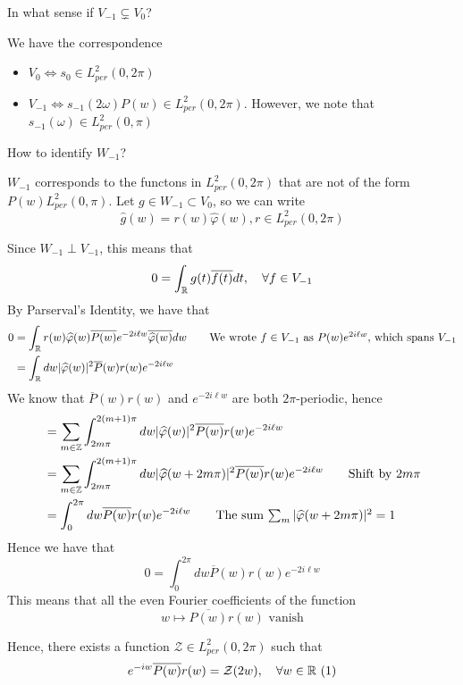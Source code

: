 \documentclass{article}
\begin{document}
{\begin{question}
    In what sense if $V_{-1} \subsetneq V_0$?
\end{question}
We have the correspondence
\begin{itemize}
    \item $V_0 \iff s_0 \in L^2_{per}(0, 2\pi)$
    \item $V_{-1} \iff s_{-1}(2\omega) P(w) \in L^2_{per}(0, 2\pi)$. However, we note that $s_{-1}(\omega) \in L_{per}^2(0, \pi)$
\end{itemize}

\begin{question}
How to identify $W_{-1}$?
\end{question}

$W_{-1}$ corresponds to the functons in $L^2_{per}(0, 2\pi)$ that are not of the form $P(w) L^2_{per}(0, \pi)$. Let $g \in W_{-1} \subset V_0$, so we can write
\[\widehat{g}(w) = r(w) \widehat{\varphi}(w), r \in L^2_{per}(0, 2\pi)\]

Since $W_{-1} \perp V_{-1}$, this means that
\[0 = \int_{\mathbb{R}} g(t) \overline{f(t)} dt,\quad \forall f \in V_{-1}\]
By Parserval's Identity, we have that
\begin{align*}
    0 &= \int_{\Rbb} r(w) \widehat{\varphi}(w) \overline{P(w)} e^{-2i \ell w} \overline{\widehat{\varphi}(w)} dw \tag*{We wrote $f \in V_{-1}$ as $P(w) e^{2i \ell w}$, which spans $V_{-1}$} \\
    &= \int_{\Rbb} dw |\widehat{\varphi}(w)|^2 \overline{P}(w) r(w) e^{-2i \ell w}
\end{align*}
We know that $\overline{P}(w) r(w)$ and $e^{-2i \ell w}$ are both $2\pi$-periodic, hence
\begin{align*}
    &= \sum_{m \in \Zbb} \int_{2m \pi}^{2(m+1)\pi} dw |\widehat{\varphi}(w)|^2 \overline{P(w)} r(w) e^{-2i \ell w}\\
    &= \sum_{m \in \Zbb} \int_{2m \pi}^{2(m+1)\pi} dw |\widehat{\varphi}(w + 2m\pi)|^2 \overline{P(w)} r(w) e^{-2i \ell w} \tag*{Shift by $2m \pi$}\\
    &= \int_{0}^{2\pi} dw \overline{P(w)} r(w) e^{-2i \ell w} \tag*{The sum $\sum_m |\widehat{\varphi}(w + 2m\pi)|^2 = 1$}
\end{align*}
Hence we have that
\[0 = \int_{0}^{2\pi} dw \overline{P}(w) r(w) e^{-2i \ell w}\]
This means that all the even Fourier coefficients of the function
\[w \mapsto \overline{P(w)} r(w) \text{ vanish}\]

Hence, there exists a function $\mathcal{Z} \in L^2_{per}(0, 2\pi)$ such that
\[e^{-iw} \overline{P(w)} r(w) = \mathcal{Z}(2w),\quad \forall w \in \mathbb{R}\ (1) \]

}
\end{document}
